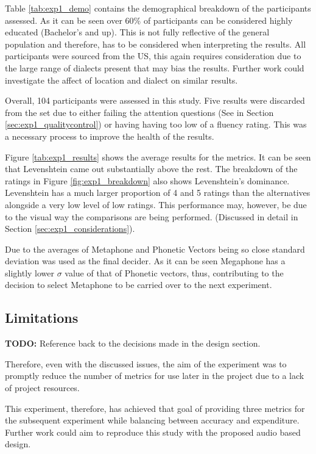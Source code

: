 Table \ref{tab:exp1_demo} contains the demographical breakdown of the participants assessed. As it can be seen over 60\% of participants can be considered highly educated (Bachelor’s and up). This is not fully reflective of the general population and therefore, has to be considered when interpreting the results. All participants were sourced from the US, this again requires consideration due to the large range of dialects present that may bias the results. Further work could investigate the affect of location and dialect on similar results. 

Overall, 104 participants were assessed in this study. Five results were discarded from the set due to either failing the attention questions (See in Section \ref{sec:exp1_qualitycontrol}) or having having too low of a fluency rating. This was a necessary process to improve the health of the results. 

Figure \ref{tab:exp1_results} shows the average results for the metrics. It can be seen that Levenshtein came out substantially above the rest. The breakdown of the ratings in Figure \ref{fig:exp1_breakdown} also shows Levenshtein's dominance. Levenshtein has a much larger proportion of 4 and 5 ratings than the alternatives alongside a very low level of low ratings. This performance may, however, be due to the visual way the comparisons are being performed. (Discussed in detail in Section \ref{sec:exp1_considerations}). 

Due to the averages of Metaphone and Phonetic Vectors being so close standard deviation was used as the final decider. As it can be seen Megaphone has a slightly lower $\sigma$ value of that of Phonetic vectors, thus, contributing to the decision to select Metaphone to be carried over to the next experiment.

\subsection{Limitations}

\textbf{TODO: } Reference back to the decisions made in the design section.

Therefore, even with the discussed issues, the aim of the experiment was to promptly reduce the number of metrics for use later in the project due to a lack of project resources.

This experiment, therefore, has achieved that goal of providing three metrics for the subsequent experiment while balancing between accuracy and expenditure. Further work could aim to reproduce this study with the proposed audio based design.

